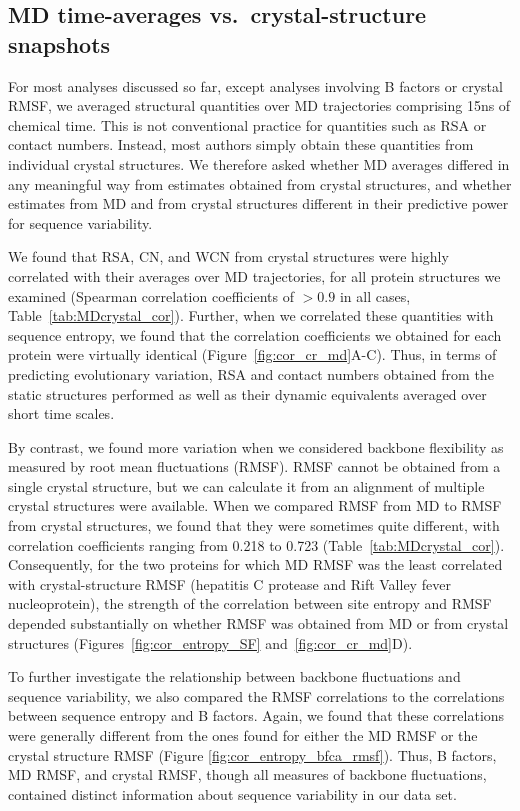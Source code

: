 \documentclass[12pt]{article}
\begin{document}
\subsection*{MD time-averages vs.\ crystal-structure snapshots}

For most analyses discussed so far, except analyses involving B factors or crystal RMSF, we averaged structural quantities over MD trajectories comprising 15ns of chemical time. This is not conventional practice for quantities such as RSA or contact numbers. Instead, most authors simply obtain these quantities from individual crystal structures. We therefore asked whether MD averages differed in any meaningful way from estimates obtained from crystal structures, and whether estimates from MD and from crystal structures different in their predictive power for sequence variability.

We found that RSA, CN, and WCN from crystal structures were highly correlated with their averages over MD trajectories, for all protein structures we examined (Spearman correlation coefficients of $>0.9$ in all cases, Table~\ref{tab:MDcrystal_cor}). Further, when we correlated these quantities with sequence entropy, we found that the correlation coefficients we obtained for each protein were virtually identical (Figure~\ref{fig:cor_cr_md}A-C). Thus, in terms of predicting evolutionary variation, RSA and contact numbers obtained from the static structures performed as well as their dynamic equivalents averaged over short time scales.

By contrast, we found more variation when we considered backbone flexibility as measured by root mean fluctuations (RMSF). RMSF cannot be obtained from a single crystal structure, but we can calculate it from an alignment of multiple crystal structures were available. When we compared RMSF from MD to RMSF from crystal structures, we found that they were sometimes quite different, with correlation coefficients ranging from 0.218 to 0.723 (Table~\ref{tab:MDcrystal_cor}). Consequently, for the two proteins for which MD RMSF was the least correlated with crystal-structure RMSF (hepatitis C protease and Rift Valley fever nucleoprotein), the strength of the correlation between site entropy and RMSF depended substantially on whether RMSF was obtained from MD or from crystal structures (Figures~\ref{fig:cor_entropy_SF} and~\ref{fig:cor_cr_md}D).

To further investigate the relationship between backbone fluctuations and sequence variability, we also compared the RMSF correlations to the correlations between sequence entropy and B factors. Again, we found that these correlations were generally different from the ones found for either the MD RMSF or the crystal structure RMSF (Figure \ref{fig:cor_entropy_bfca_rmsf}). Thus, B factors, MD RMSF, and crystal RMSF, though all measures of backbone fluctuations, contained distinct information about sequence variability in our data set.
\end{document}
